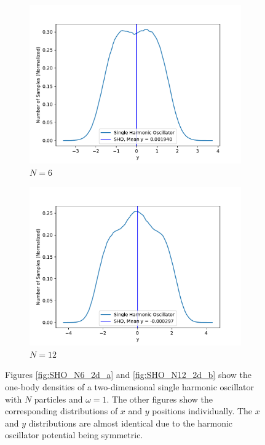 \documentclass[../main.tex]{subfiles}
\begin{document}
\begin{figure}
\medskip
\begin{subfigure}{0.48\textwidth}
\includegraphics[width=\linewidth]{figures/densitySHO/density_SHO_N6_Omega1_2d_y}
\caption{$N=6$} \label{fig:SHO_N6_2d_y_e}
\end{subfigure}\hspace*{\fill}
\begin{subfigure}{0.48\textwidth}
\includegraphics[width=\linewidth]{figures/densitySHO/density_SHO_N12_Omega1_2d_y}
\caption{$N=12$} \label{fig:SHO_N12_2d_y_f}
\end{subfigure}

\caption{Figures \ref{fig:SHO_N6_2d_a} and \ref{fig:SHO_N12_2d_b} show the one-body densities of a two-dimensional single harmonic oscillator with $N$ particles and $\omega=1$. The other figures show the corresponding distributions of $x$ and $y$ positions individually. The $x$ and $y$ distributions are almost identical due to the harmonic oscillator potential being symmetric.} \label{fig:SHO_density2d}
\end{figure}
\end{document}
